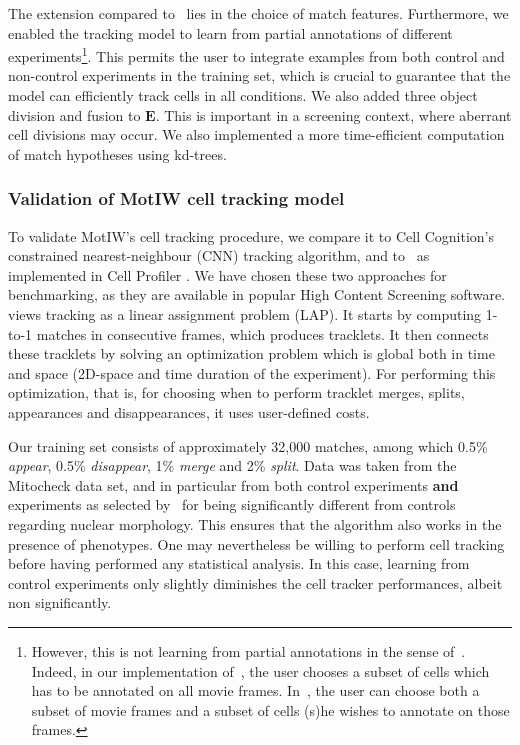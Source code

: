 The extension compared to~\cite{lou} lies in the choice of match
features. Furthermore, we enabled the tracking model to learn from
partial annotations of different experiments\footnote{However, this is
  not learning from partial annotations in the sense
  of~\cite{loupartial}. Indeed, in our implementation of~\cite{lou},
  the user chooses a subset of cells which has to be annotated on all
  movie frames. In~\cite{loupartial}, the user can choose both a
  subset of movie frames and a subset of cells (s)he wishes to
  annotate on those frames.}. This permits the user to integrate
examples from both control and non-control experiments in the training
set, which is crucial to guarantee that the model can efficiently
track cells in all conditions. We also added three object division and
fusion to $\mathbf{E}$. This is important in a screening context,
where aberrant cell divisions may occur. We also implemented a more time-efficient computation of match hypotheses
using kd-trees.

\subsubsection{Validation of MotIW cell tracking model}
To validate MotIW's cell tracking procedure, we compare it to Cell Cognition's constrained nearest-neighbour (CNN) tracking algorithm, and to~\cite{jaqaman} as implemented in Cell Profiler \cite{Carpenter2006}. We have chosen these two approaches for benchmarking, as they are available in popular High Content Screening software. \cite{jaqaman} views tracking as a linear assignment problem (LAP). It starts by computing 1-to-1 matches in consecutive frames, which produces tracklets. It then connects these tracklets by solving an optimization problem which is global both in time and space (2D-space and time duration of the experiment). For performing this optimization, that is, for choosing when to perform tracklet merges, splits, appearances and disappearances, it uses user-defined costs. 

Our training set consists of approximately 32,000 matches, among which
0.5\% \textit{appear}, 0.5\% \textit{disappear}, 1\% \textit{merge}
and 2\% \textit{split}. Data was taken from the Mitocheck data
set, and in particular from both control experiments \textbf{and}
experiments as selected by~\cite{pmid20360735} for being significantly
different from controls regarding nuclear morphology. This ensures
that the algorithm also works in the presence of phenotypes. One may
nevertheless be willing to perform cell tracking before having
performed any statistical analysis. In this case, learning from
control experiments only slightly diminishes the cell tracker
performances, albeit non significantly. 

